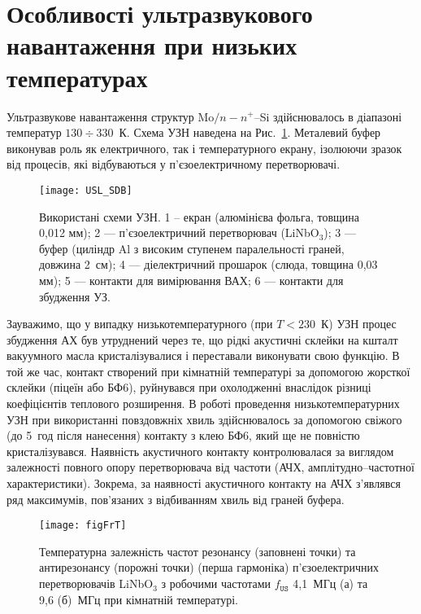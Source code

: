 \section{Особливості ультразвукового навантаження при низьких температурах\label{SSDB:USL}}

Ультразвукове навантаження структур Mo$/n-n^+$--Si здійснювалось в діапазоні температур $130\div330$~К.
Схема УЗН наведена на Рис.~\ref{figUSL:SDB}.
Металевий буфер виконував роль як електричного, так і температурного екрану, ізолюючи зразок від процесів, які відбуваються у
п'єзоелектричному перетворювачі.


\begin{figure}[b]
\center
\texttt{[image: USL\_SDB]}%
\caption{\label{figUSL:SDB}
Використані схеми УЗН.
1 --  екран (алюмінієва фольга, товщина 0,012 мм);
2 --- п'єзоелектричний перетворювач (LiNbO$_3$);
3 --- буфер (циліндр Al з високим ступенем паралельності граней, довжина 2~см);
4 --- діелектричний прошарок (слюда, товщина 0,03 мм);
5 --- контакти для вимірювання ВАХ;
6 --- контакти для збудження УЗ.
}
\end{figure}


Зауважимо, що у випадку низькотемпературного (при $T<230$~К) УЗН процес збудження АХ був утруднений через те, що
рідкі акустичні склейки на кшталт вакуумного масла кристалізувалися і переставали виконувати свою функцію.
В той же час, контакт створений при кімнатній температурі за допомогою жорсткої склейки (піцеїн або БФ6),
руйнувався при охолодженні внаслідок різниці коефіцієнтів теплового розширення.
В роботі проведення низькотемпературних УЗН при використанні повздовжніх хвиль здійснювалось за допомогою свіжого (до 5~год після нанесення) контакту з клею БФ6,
який ще не повністю кристалізувався.
Наявність акустичного контакту контролювалася за виглядом залежності повного опору перетворювача від частоти (АЧХ, амплітудно--частотної характеристики).
Зокрема, за наявності акустичного контакту на АЧХ з'являвся ряд максимумів, пов'язаних з відбиванням хвиль від граней буфера.

\begin{figure}
\center
\texttt{[image: figFrT]}%
\caption{\label{figFrT}
Температурна залежність частот резонансу (заповнені точки) та антирезонансу (порожні точки) (перша гармоніка)
п'єзоелектричних перетворювачів LiNbO$_3$ з робочими частотами $f_\mathtt{US}$ 4,1~МГц (а) та 9,6 (б)~МГц при кімнатній температурі.
}
\end{figure}


